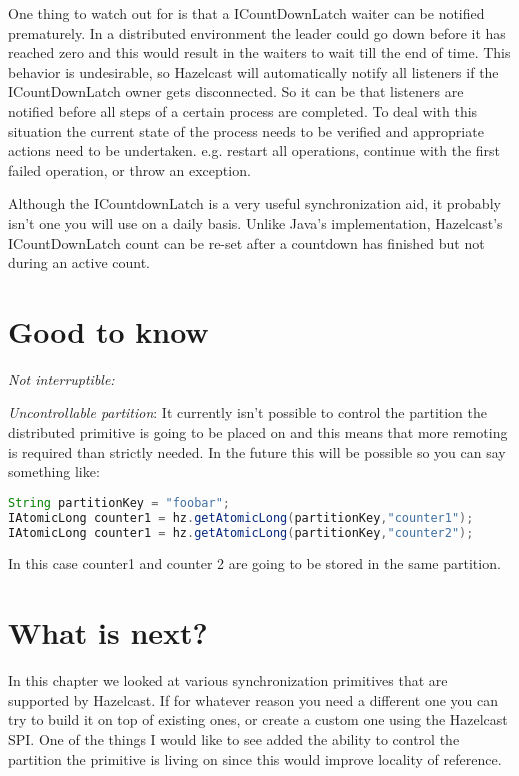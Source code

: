 One thing to watch out for is that a ICountDownLatch waiter can be notified prematurely. In a distributed environment the leader could go down before it has reached zero and this would result in the waiters to wait till the end of time. This behavior is undesirable, so Hazelcast will automatically notify all listeners if the ICountDownLatch owner gets disconnected. So it can be that listeners are notified before all steps of a certain process are completed. To deal with this situation the current state of the process needs to be verified and appropriate actions need to be undertaken. e.g. restart all operations, continue with the first failed operation, or throw an exception.

Although the ICountdownLatch is a very useful synchronization aid, it probably isn't one you will use on a daily basis. Unlike Java's implementation, Hazelcast's ICountDownLatch count can be re-set after a countdown has finished but not during an active count. 

\section{Good to know}

\emph{Not interruptible:}

\emph{Uncontrollable partition}: It currently isn't possible to control the partition the distributed primitive is going to be placed on and this means that more remoting is required than strictly needed. In the future this will be possible so you can say something like:
\begin{lstlisting}[language=java]
String partitionKey = "foobar";
IAtomicLong counter1 = hz.getAtomicLong(partitionKey,"counter1");
IAtomicLong counter1 = hz.getAtomicLong(partitionKey,"counter2");
\end{lstlisting}
In this case counter1 and counter 2 are going to be stored in the same partition.

\section{What is next?}
In this chapter we looked at various synchronization primitives that are supported by Hazelcast. If for whatever reason you need a different one you can try to build it on top of existing ones, or create a custom one using the Hazelcast SPI. One of the things I would like to see added the ability to control the partition the primitive is living on since this would improve locality of reference. 
